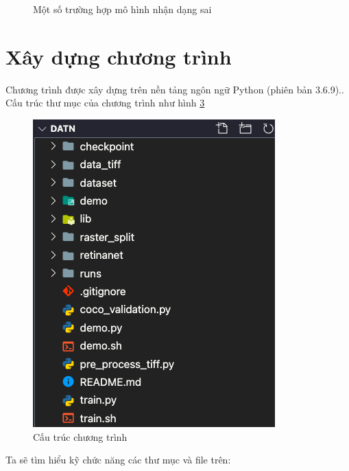 \documentclass[a4paper, 12pt]{report}
\begin{document}
\begin{figure}[!h]
\begin{subfigure}[!h]{0.45\textwidth}
        \label{fig:subfig2}
    \end{subfigure}
    \caption[Optional caption for list of figures]{Một số trường hợp mô hình nhận dạng sai}
    \label{fig:demo_split}
\end{figure}

\section{Xây dựng chương trình}
Chương trình được xây dựng trên nền tảng ngôn ngữ Python (phiên bản 3.6.9).. Cấu trúc thư mục của chương trình như hình \ref{fig:tree_DATN} 
 \begin{figure}[!h]
	\centering
	\includegraphics[width=0.8\linewidth]{Images/tree_DATN}
	\caption{Cấu trúc chương trình}
	\label{fig:tree_DATN}
\end{figure}
Ta sẽ tìm hiểu kỹ chức năng các thư mục và file trên:
\end{document}
